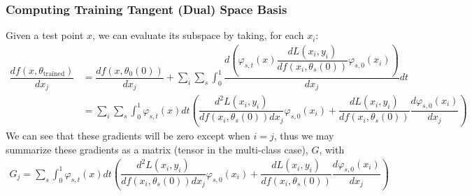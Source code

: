 \begin{frame}
  \frametitle{Computing Training Tangent (Dual) Space Basis}
  Given a test point $x$, we can evaluate its subspace by taking, for each $x_i$:
\begin{align}
    \dfrac{df(x, \theta_\text{trained})}{dx_j} &= \dfrac{df(x, \theta_0(0))}{dx_j} + \sum_i \sum_s \int_0^1 \dfrac{d\left(\varphi_{s,t}(x) \dfrac{dL(x_i, y_i)}{df(x_i, \theta_s(0))} \varphi_{s, 0}(x_i)\right)}{dx_j} dt\\
    &= \sum_i \sum_s \int_0^1 \varphi_{s,t}(x)dt \left(\dfrac{d^2L(x_i, y_i)}{df(x_i, \theta_s(0)) dx_j} \varphi_{s, 0}(x_i) + \dfrac{dL(x_i, y_i)}{df(x_i, \theta_s(0))} \dfrac{d\varphi_{s, 0}(x_i)}{dx_j}\right) 
\end{align}
We can see that these gradients will be zero except when $i = j$, thus we may summarize these gradients as a matrix (tensor in the multi-class case), $G$, with 
\begin{align}
    G_j = \sum_s \int_0^1 \varphi_{s,t}(x)dt \left(\dfrac{d^2L(x_i, y_i)}{df(x_i, \theta_s(0)) dx_j} \varphi_{s, 0}(x_i) + \dfrac{dL(x_i, y_i)}{df(x_i, \theta_s(0))} \dfrac{d\varphi_{s, 0}(x_i)}{dx_j}\right)
    \label{eq:input_decomp}
\end{align}
\end{frame}

